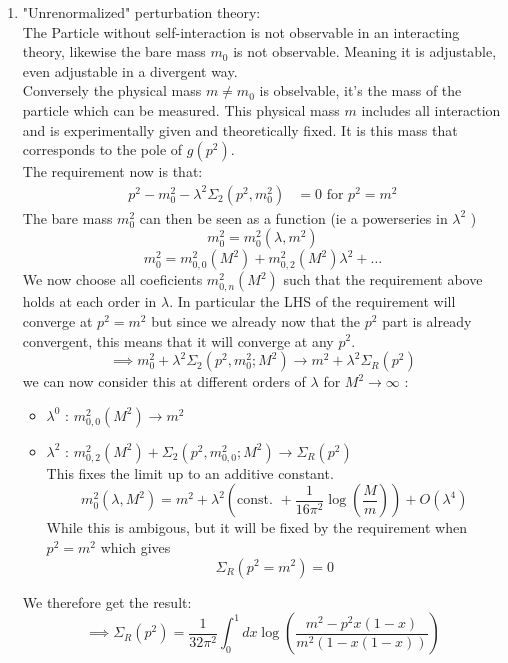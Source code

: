 \documentclass{report}
\begin{document}
\begin{enumerate}
  \item "Unrenormalized" perturbation theory: \\
    The Particle without self-interaction is not observable in an interacting theory, likewise the bare mass $m_0$ is not observable. Meaning it is adjustable, even adjustable in a divergent way.\\
    Conversely the physical mass $m \neq m_0$ is obselvable, it's the mass of the particle which can be measured. This physical mass $m$ includes all interaction and is experimentally given and theoretically fixed. It is this mass that corresponds to the pole of $g\left( p^2 \right) $. \\
    The requirement now is that: 
    \begin{align*}
      p^2 - m_0^2 - \lambda^2 \Sigma_2\left( p^2, m_0^2 \right) &= 0 \text{ for } p^2 = m^2
    \end{align*}
    The bare mass $m_0^2$ can then be seen as a function (ie a powerseries in $\lambda^2$ )\[
    m_0^2 = m_0^2\left( \lambda, m^2 \right) 
    \] \[
    m_0^2 = m_{0,0}^2\left( M^2 \right) + m_{0,2}^2\left( M^2 \right) \lambda^2 + \ldots
    \] We now choose all coeficients $m_{0,n}^2\left( M^2 \right) $ such that the requirement above holds at each order in $\lambda$. In particular the LHS of the requirement will converge at $p^2 = m^2$ but since we already now that the $p^2$ part is already convergent, this means that it will converge at any $p^2$.\[
    \implies m_0^2 + \lambda^2 \Sigma_2\left( p^2, m_0^2; M^2 \right) \to m^2 + \lambda^2 \Sigma_R\left( p^2 \right) 
    \] we can now consider this at different orders of $\lambda$ for $M^2 \to \infty$ :
    \begin{itemize}
      \item $\lambda^{0} $ : $m_{0,0}^2\left( M^2 \right) \to m^2$ 
      \item $\lambda^2$ : $m_{0,2}^2\left( M^2 \right) + \Sigma_2\left( p^2, m_{0,0}^2; M^2 \right) \to \Sigma_R\left( p^2 \right)  $ \\
        This fixes the limit up to an additive constant. \[
      m_0^2\left( \lambda, M^2 \right) = m^2 + \lambda^2 \left( \text{const. } + \frac{1}{16 \pi^2} \log\left( \frac{M}{m}  \right)  \right) + O\left( \lambda^{4}  \right) 
      \] While this is ambigous, but it will be fixed by the requirement when $p^2 = m^2$ which gives \[
      \Sigma_R\left( p^2 = m^2 \right) = 0
      \] 
    \end{itemize}
    We therefore get the result: \[
    \implies \Sigma_R\left( p^2 \right) =\frac{1}{32 \pi^2} \int_{0}^{1} dx \log\left( \frac{m^2 - p^2x\left( 1-x \right) }{m^2\left( 1 - x\left( 1-x \right)  \right) }  \right)  
    \] 
\end{enumerate}
\end{document}

